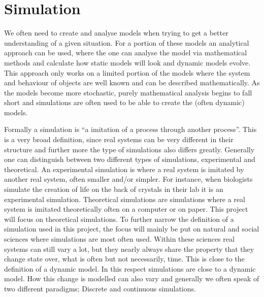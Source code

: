 \section{Simulation}
We often need to create and analyse models when trying to get a better understanding of a given situation. For a portion of these models an analytical approach can be used, where the one can analyse the model via mathematical methods and calculate how static models will look and dynamic models evolve. This approach only works on a limited portion of the models where the system and behaviour of objects are well known and can be described mathematically. As the models become more stochastic, purely mathematical analysis begins to fall short and simulations are often used to be able to create the (often dynamic) models.

Formally a simulation is \enquote{a imitation of a process through another process}. This is a very broad definition, since real systems can be very different in their structure and further more the type of simulations also differs greatly. Generally one can distinguish between two different types of simulations, experimental and theoretical. An experimental simulation is where a real system is imitated by another real system, often smaller and/or simpler. For instance, when biologists simulate the creation of life on the back of crystals in their lab it is an experimental simulation. Theoretical simulations are simulations where a real system is imitated theoretically often on a computer or on paper. This project will focus on theoretical simulations. To further narrow the definition of a simulation used in this project, the focus will mainly be put on natural and social sciences where simulations are most often used. Within these sciences real systems can still vary a lot, but they nearly always share the property that they change state over, what is often but not necessarily, time. This is close to the definition of a dynamic model. In this respect simulations are close to a dynamic model. How this change is modelled can also vary and generally we often speak of two different paradigms; Discrete and continuous simulations.

